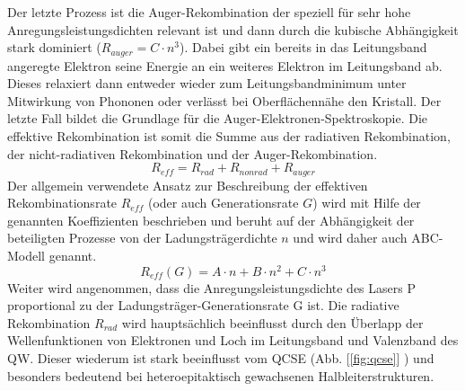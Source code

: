 Der letzte Prozess ist die Auger-Rekombination der speziell für sehr hohe Anregungsleistungsdichten relevant ist und dann durch die kubische Abhängigkeit stark dominiert ($R_{auger} = C \cdot n^3 $). Dabei gibt ein bereits in das Leitungsband angeregte Elektron seine Energie an ein weiteres Elektron im Leitungsband ab. Dieses relaxiert dann entweder wieder zum Leitungsbandminimum unter Mitwirkung von Phononen oder verlässt bei Oberflächennähe den Kristall. Der letzte Fall bildet die Grundlage für die Auger-Elektronen-Spektroskopie.
Die effektive Rekombination ist somit die Summe aus der radiativen Rekombination, der nicht-radiativen Rekombination und der Auger-Rekombination.
\begin{equation}
    R_{eff} = R_{rad} + R_{nonrad} + R_{auger}
    \label{eq:iqe1}
\end{equation}
Der allgemein verwendete Ansatz zur Beschreibung der effektiven Rekombinationsrate $R_{eff}$ (oder auch Generationsrate $G$) wird mit Hilfe der genannten Koeffizienten beschrieben und beruht auf der Abhängigkeit der beteiligten Prozesse von der Ladungsträgerdichte $n$ und wird daher auch ABC-Modell genannt.
\begin{equation}
    R_{eff} (G) = A \cdot n + B \cdot n^2 + C \cdot n^3 
    \label{eq:iqe2}
\end{equation}
Weiter wird angenommen, dass die Anregungsleistungsdichte des Lasers P proportional zu
der Ladungsträger-Generationsrate G ist. Die radiative Rekombination $R_{rad}$ wird hauptsächlich beeinflusst durch den Überlapp der Wellenfunktionen von Elektronen und Loch im Leitungsband und Valenzband des QW. Dieser wiederum ist stark beeinflusst vom QCSE (Abb. 
[\ref{fig:qcse}] ) und besonders bedeutend bei heteroepitaktisch gewachsenen Halbleiterstrukturen. 
%
